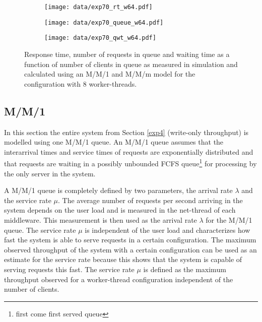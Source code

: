 \documentclass[report.tex]{subfiles}
\begin{document}
\begin{figure}
	\begin{subfigure}[b]{.33\linewidth}
		\centering
		\texttt{[image: data/exp70\_rt\_w64.pdf]}
	\end{subfigure}\hfill
	\begin{subfigure}[b]{.33\linewidth}
		\centering
		\texttt{[image: data/exp70\_queue\_w64.pdf]}
	\end{subfigure}\hfill
	\begin{subfigure}[b]{.33\linewidth}
		\centering
		\texttt{[image: data/exp70\_qwt\_w64.pdf]}
	\end{subfigure}
	\caption{Response time, number of requests in queue and waiting time as a function of number of clients in queue as measured in simulation and calculated using an M/M/1 and M/M/m model for the configuration with 8 worker-threads.}\label{exp70_w64}
\end{figure}

\subsection{M/M/1}


In this section the entire system from Section \ref{exp4} (write-only throughput) is modelled using one M/M/1 queue. An M/M/1 queue assumes that the interarrival times and service times of requests are exponentially distributed and that requests are waiting in a possibly unbounded FCFS queue\footnote{first come first served queue} for processing by the only server in the system.

A M/M/1 queue is completely defined by two parameters, the arrival rate $\lambda$ and the service rate $\mu$.
The average number of requests per second arriving in the system depends on the user load and is measured in the net-thread of each middleware. This measurement is then used as the arrival rate $\lambda$ for the M/M/1 queue.
The service rate $\mu$ is independent of the user load and characterizes how fast the system is able to serve requests in a certain configuration.  
The maximum observed throughput of the system with a certain configuration can be used as an estimate for the service rate because this shows that the system is capable of serving requests this fast. 
The service rate $\mu$ is defined as the maximum throughput observed for a worker-thread configuration independent of the number of clients.
\end{document}

